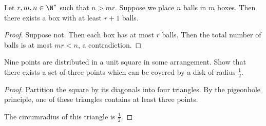 \begin{theorem} \label{thm:php:generalised}
    Let $r, m, n \in \N^*$ such that $n > mr$.
    Suppose we place $n$ balls in $m$ boxes.
    Then there exists a box with at least $r+1$ balls.
\end{theorem}
\begin{proof}
    Suppose not.
    Then each box has at most $r$ balls.
    Then the total number of balls is at most $mr < n$, a contradiction.
\end{proof}

\begin{example}
    Nine points are distributed in a unit square in some arrangement.
    Show that there exists a set of three points which can be covered by a
    disk of radius $\frac12$.
\end{example}
\begin{proof}
    Partition the square by its diagonals into four triangles.
    By the pigeonhole principle, one of these triangles contains at least
    three points.
    \begin{center}
    \end{center}
    The circumradius of this triangle is $\frac12$.
\end{proof}

